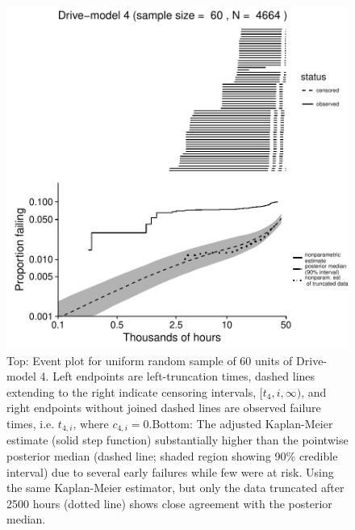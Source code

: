 \documentclass[12pt]{article}
\begin{document}
\begin{figure}
\centering
\includegraphics{dm4-exception}
\caption{\small Top: Event plot for uniform random sample of 60 units of Drive-model 4. Left endpoints are left-truncation times, dashed lines extending to the right indicate censoring intervals, $[t_4,i, \infty)$, and right endpoints without joined dashed lines are observed failure times, i.e. $t_{4,i}\mbox{, where }c_{4,i}=0$.\hspace{\textwidth}Bottom: The adjusted Kaplan-Meier estimate (solid step function) substantially higher than the pointwise posterior median (dashed line; shaded region showing 90\% credible interval) due to several early failures while few were at risk.  Using the same Kaplan-Meier estimator, but only the data truncated after 2500 hours (dotted line) shows close agreement with the posterior median.}

\label{fig:ex-mod-4}
\end{figure}
\end{document}

